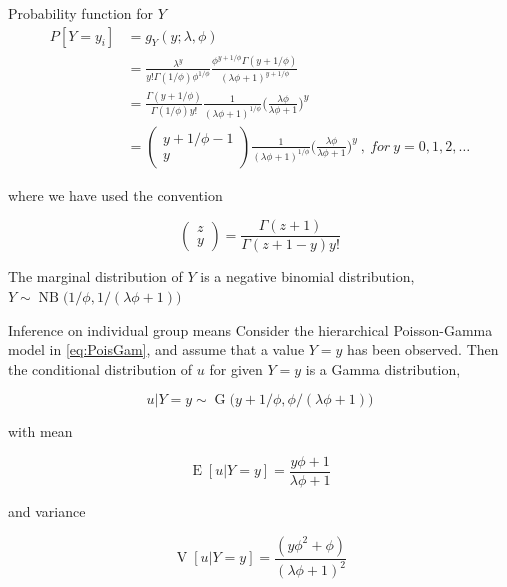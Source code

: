 \documentclass[aspectratio=169]{beamer}
\DeclareMathOperator{\E}{E}
\DeclareMathOperator{\V}{V}
\DeclareMathOperator{\G}{G}
\DeclareMathOperator{\NB}{NB}
\begin{document}
\begin{frame}{Probability function for \(Y\)}
\protect\hypertarget{probability-function-for-y}{}
\begin{equation} \label{eq:pdfMix}
  \begin{aligned}
    P[Y=y_i]&=g_{Y}(y;\lambda, \phi) \\
    &=\frac{\lambda^{y}}{y!\Gamma(1/\phi)\phi^{1/\phi}}\frac{\phi^{y+1/\phi}\Gamma(y+1/\phi)}{(\lambda \phi + 1)^{y+1/\phi}} \\
    &=\frac{\Gamma(y+1/\phi)}{\Gamma(1/\phi)y!}\frac{1}{(\lambda\phi+1)^{1/\phi}}\bigg(\frac{\lambda\phi}{\lambda\phi+1}\bigg)^{y} \\
    &=\begin{pmatrix} y+1/\phi-1 \\ y \end{pmatrix} \frac{1}{(\lambda\phi+1)^{1/\phi}}\bigg(\frac{\lambda\phi}{\lambda\phi+1}\bigg)^{y} \ , \ for \ y = 0, 1, 2, \dots
  \end{aligned}
\end{equation}

where we have used the convention

\begin{equation}
  \begin{pmatrix} z\\y \end{pmatrix} = \frac{\Gamma(z+1)}{\Gamma(z+1-y)y!}
\end{equation}

The marginal distribution of \(Y\) is a negative binomial distribution,
\(Y\sim \NB\big(1/\phi,1/(\lambda \phi+1)\big)\)
\end{frame}

\begin{frame}{Inference on individual group means}
\protect\hypertarget{inference-on-individual-group-means}{}
Consider the hierarchical Poisson-Gamma model in \eqref{eq:PoisGam}, and
assume that a value \(Y=y\) has been observed. Then the conditional
distribution of \(u\) for given \(Y=y\) is a Gamma distribution,

\begin{equation}
  u|Y=y\sim \G\big(y+1/\phi,\phi/(\lambda \phi+1)\big)
\end{equation}

with mean

\begin{equation}
  \E[u|Y=y]=\frac{y\phi+1}{\lambda\phi+1}
\end{equation}

and variance

\begin{equation}
  \V[u|Y=y]=\frac{(y \phi^2+\phi)}{(\lambda \phi + 1)^2}
\end{equation}
\end{frame}
\end{document}
